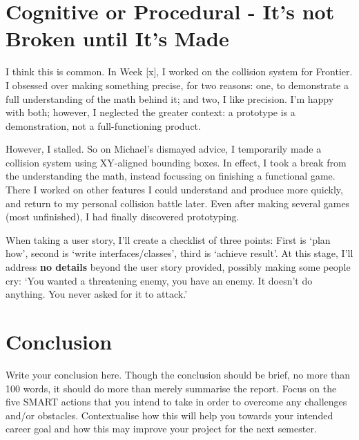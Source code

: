 \documentclass{scrartcl}
\begin{document}
\section{Cognitive or Procedural - It's not Broken until It's Made}

I think this is common. In Week [x], I worked on the collision system for Frontier. I obsessed over making something precise, for two reasons: one, to demonstrate a full understanding of the math behind it; and two, I like precision. I'm happy with both; however, I neglected the greater context: a prototype is a demonstration, not a full-functioning product.

However, I stalled. So on Michael's dismayed advice, I temporarily made a collision system using XY-aligned bounding boxes. In effect, I took a break from the understanding the math, instead focussing on finishing a functional game. There I worked on other features I could understand and produce more quickly, and return to my personal collision battle later. Even after making several games (most unfinished), I had finally discovered prototyping.

When taking a user story, I'll create a checklist of three points: First is `plan how', second is `write interfaces/classes', third is `achieve result'. At this stage, I'll address \textbf{no details} beyond the user story provided, possibly making some people cry: `You wanted a threatening enemy, you have an enemy. It doesn't do anything. You never asked for it to attack.'

\section{Conclusion}

Write your conclusion here. Though the conclusion should be brief, no more than 100 words, it should do more than merely summarise the report. Focus on the five SMART actions that you intend to take in order to overcome any challenges and/or obstacles. Contextualise how this will help you towards your intended career goal and how this may improve your project for the next semester.



\end{document}
